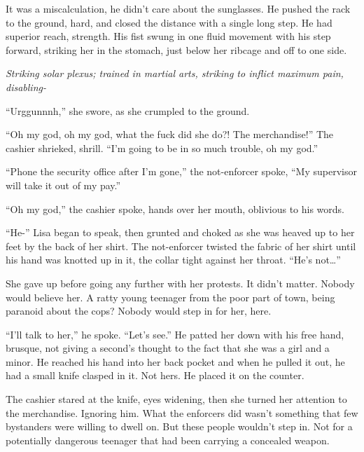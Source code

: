 It was a miscalculation, he didn't care about the sunglasses.  He pushed the rack to the ground, hard, and closed the distance with a single long step.  He had superior reach, strength.  His fist swung in one fluid movement with his step forward, striking her in the stomach, just below her ribcage and off to one side.



\emph{Striking solar plexus; trained in martial arts, striking to inflict maximum pain, disabling-}



``Urggunnnh,'' she swore, as she crumpled to the ground.



``Oh my god, oh my god, what the fuck did she do?!  The merchandise!'' The cashier shrieked, shrill.  ``I'm going to be in so much trouble, oh my god.''



``Phone the security office after I'm gone,'' the not-enforcer spoke, ``My supervisor will take it out of my pay.''



``Oh my god,'' the cashier spoke, hands over her mouth, oblivious to his words.



``He-'' Lisa began to speak, then grunted and choked as she was heaved up to her feet by the back of her shirt.  The not-enforcer twisted the fabric of her shirt until his hand was knotted up in it, the collar tight against her throat.  ``He's not\ldots''



She gave up before going any further with her protests.  It didn't matter.  Nobody would believe her.  A ratty young teenager from the poor part of town, being paranoid about the cops?  Nobody would step in for her, here.



``I'll talk to her,'' he spoke.  ``Let's see.''  He patted her down with his free hand, brusque, not giving a second's thought to the fact that she was a girl and a minor.  He reached his hand into her back pocket and when he pulled it out, he had a small knife clasped in it.  Not hers.  He placed it on the counter.



The cashier stared at the knife, eyes widening, then she turned her attention to the merchandise.  Ignoring him.  What the enforcers did wasn't something that few bystanders were willing to dwell on.  But these people wouldn't step in.  Not for a potentially dangerous teenager that had been carrying a concealed weapon.



